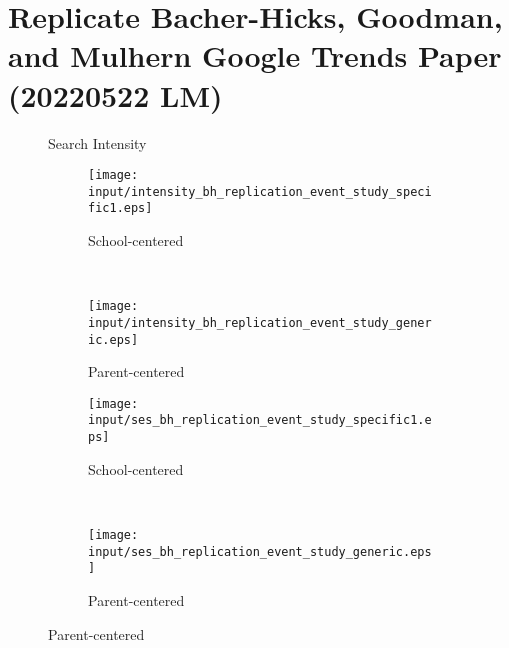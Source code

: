 \section{Replicate Bacher-Hicks, Goodman, and Mulhern Google Trends Paper (20220522 LM)}

\begin{figure}[hbt!]
  \caption{Search Intensity}
    \centering
    \begin{subfigure}[t]{0.45\textwidth}
    \caption{School-centered}
        \centering
        \texttt{[image: input/intensity\_bh\_replication\_event\_study\_specific1.eps]}
    \end{subfigure}%
    ~
    \begin{subfigure}[t]{0.45\textwidth}
    \caption{Parent-centered}
        \centering
        \texttt{[image: input/intensity\_bh\_replication\_event\_study\_generic.eps]}
    \end{subfigure}
    \caption{High-Low SES Search Intensity Gap}
      \centering
      \begin{subfigure}[t]{0.45\textwidth}
      \caption{School-centered}
          \centering
          \texttt{[image: input/ses\_bh\_replication\_event\_study\_specific1.eps]}
      \end{subfigure}%
      ~
      \begin{subfigure}[t]{0.45\textwidth}
      \caption{Parent-centered}
          \centering
          \texttt{[image: input/ses\_bh\_replication\_event\_study\_generic.eps]}
      \end{subfigure}
\end{figure}




